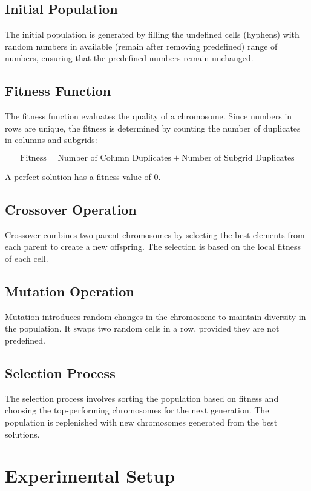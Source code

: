 \documentclass{article}
\begin{document}
\subsection{Initial Population}

The initial population is generated by filling the undefined cells (hyphens) with random numbers in available (remain
after removing predefined) range of numbers, ensuring that the predefined numbers remain unchanged.

\subsection{Fitness Function}

The fitness function evaluates the quality of a chromosome. Since numbers in rows are unique, the fitness is determined
by counting the number of duplicates in columns and subgrids:

\[
\text{Fitness} = \text{Number of Column Duplicates} + \text{Number of Subgrid Duplicates}
\]

A perfect solution has a fitness value of 0.

\subsection{Crossover Operation}

Crossover combines two parent chromosomes by selecting the best elements from each parent to create a new offspring. The selection is based on the local fitness of each cell.

\subsection{Mutation Operation}

Mutation introduces random changes in the chromosome to maintain diversity in the population. It swaps two random cells in a row, provided they are not predefined.

\subsection{Selection Process}

The selection process involves sorting the population based on fitness and choosing the top-performing chromosomes for the next generation. The population is replenished with new chromosomes generated from the best solutions.

\section{Experimental Setup}
\end{document}
